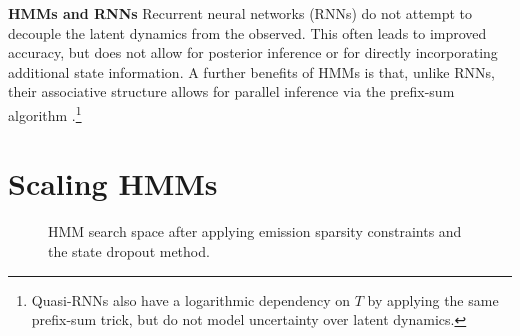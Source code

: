 \documentclass[11pt,a4paper]{article}
\begin{document}

\noindent \textbf{HMMs and RNNs}
Recurrent neural networks (RNNs) do not attempt to decouple the latent dynamics from the observed.
This often leads to improved accuracy,
but does not allow for posterior inference or for directly incorporating additional
state information.
A further benefits of HMMs is that, unlike RNNs,
their associative structure allows for parallel inference
via the prefix-sum algorithm \cite{ladner1980prefix}.\footnote{Quasi-RNNs \citep{bradbury2016qrnn} also have a logarithmic dependency on $T$
by applying the same prefix-sum trick, but do not model uncertainty over
latent dynamics.}


\section{Scaling HMMs}

\begin{figure}[!t]
\begin{center}

\end{center}
\caption{
\label{fig:trellis}
HMM search space
after applying emission sparsity constraints and the state dropout method.
}
\end{figure}
\end{document}
